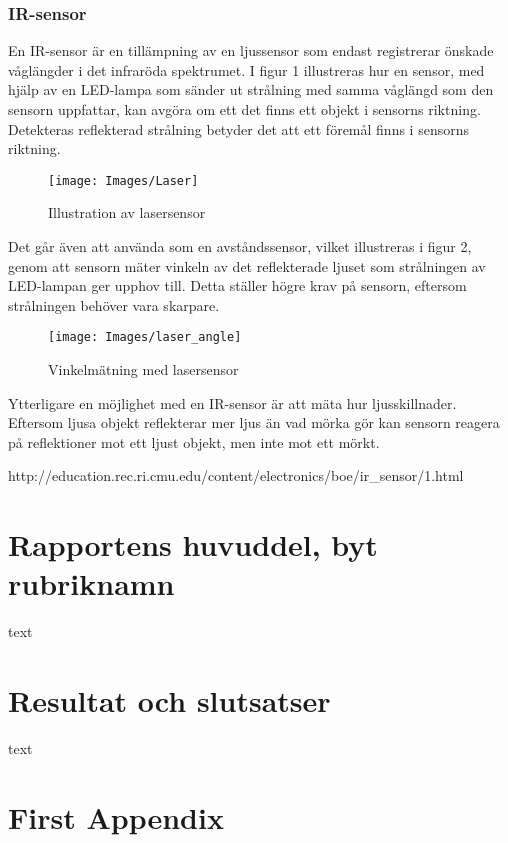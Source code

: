 \documentclass[11pt]{article}
\begin{document}
\begin{flushleft}
\subsubsection{IR-sensor}
En IR-sensor är en tillämpning av en ljussensor som endast registrerar önskade våglängder i det infraröda spektrumet. I figur 1 illustreras hur en sensor, med hjälp av en LED-lampa som sänder ut strålning med samma våglängd som den sensorn uppfattar, kan avgöra om ett det finns ett objekt i sensorns riktning. Detekteras reflekterad strålning betyder det att ett föremål finns i sensorns riktning.

\begin{figure}[htbp]
	\centering
	\texttt{[image: Images/Laser]}
	\caption{Illustration av lasersensor \label{Laser}}
\end{figure}

Det går även att använda som en avståndssensor, vilket illustreras i figur 2, genom att sensorn mäter vinkeln av det reflekterade ljuset som strålningen av LED-lampan ger upphov till. Detta ställer högre krav på sensorn, eftersom strålningen behöver vara skarpare.

\begin{figure}[htbp]
	\centering
	\texttt{[image: Images/laser\_angle]}
	\caption{Vinkelmätning med lasersensor \label{laser_angle}}
\end{figure}

Ytterligare en möjlighet med en IR-sensor är att mäta hur ljusskillnader. Eftersom ljusa objekt reflekterar mer ljus än vad mörka gör kan sensorn reagera på reflektioner mot ett ljust objekt, men inte mot ett mörkt.



http://education.rec.ri.cmu.edu/content/electronics/boe/ir_sensor/1.html


\pagebreak
\section{Rapportens huvuddel, byt rubriknamn}
text

\section{Resultat och slutsatser}
text

\pagebreak
{}



\pagebreak
\appendix
\section{First Appendix}

\end{flushleft}
\end{document}
